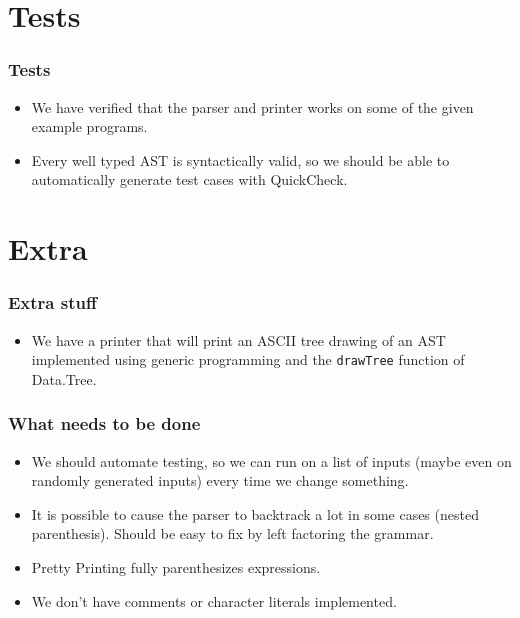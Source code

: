 \documentclass{beamer}
\begin{document}
\section{Tests}
\begin{frame}
\frametitle{Tests}

\begin{itemize}
\item We have verified that the parser and printer works on some of the given example programs.
\item Every well typed AST is syntactically valid, so we should be able to automatically generate test cases with QuickCheck.
\end{itemize}

\end{frame}

\section{Extra}
\begin{frame}
\frametitle{Extra stuff}
\begin{itemize}
\item We have a printer that will print an ASCII tree drawing of an AST implemented using generic programming and the \lstinline{drawTree} function of Data.Tree.
\end{itemize}
\end{frame}
\begin{frame}
\frametitle{What needs to be done}
\begin{itemize}
\item We should automate testing, so we can run on a list of inputs (maybe even on randomly generated inputs) every time we change something.
\item It is possible to cause the parser to backtrack a lot in some cases (nested parenthesis). Should be easy to fix by left factoring the grammar.
\item Pretty Printing fully parenthesizes expressions.
\item We don't have comments or character literals implemented.
\end{itemize}
\end{frame}
\end{document}
